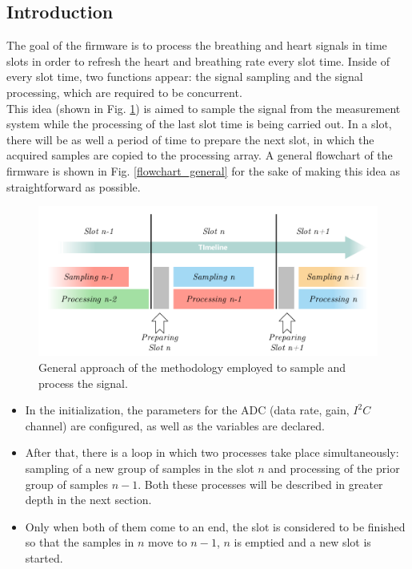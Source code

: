 \documentclass[twoside, twocolumn, spanish] {article}
\begin{document}
\subsection{Introduction}
The goal of the firmware is to process the breathing and heart signals in time slots in order to refresh the heart and breathing rate every slot time. Inside of every slot time, two functions appear: the signal sampling and the signal processing, which are required to be concurrent. \\

This idea (shown in Fig. \ref{esquema_general}) is aimed to sample the signal from the measurement system while the processing of the last slot time is being carried out. In a slot, there will be as well a period of time to prepare the next slot, in which the acquired samples are copied to the processing array. A general flowchart of the firmware is shown in Fig. \ref{flowchart_general} for the sake of making this idea as  straightforward as possible. 

\begin{figure}[!h]
\centering
\includegraphics[width=\columnwidth]{imag/esquema_general.pdf}
\caption{General approach of the methodology employed to sample and process the signal.}
\label{esquema_general}
\end{figure}

\begin{itemize}
\item In the initialization, the parameters for the ADC (data rate, gain, $I^2C$ channel) are configured, as well as the variables are declared.
\item After that, there is a loop in which two processes take place simultaneously: sampling of a new group of samples in the slot $n$ and processing of the prior group of samples $n-1$. Both these processes will be described in greater depth in the next section.
\item Only when both of them come to an end, the slot is considered to be finished so that the samples in $n$ move to $n-1$, $n$ is emptied and a new slot is started.
\end{itemize}
\end{document}
